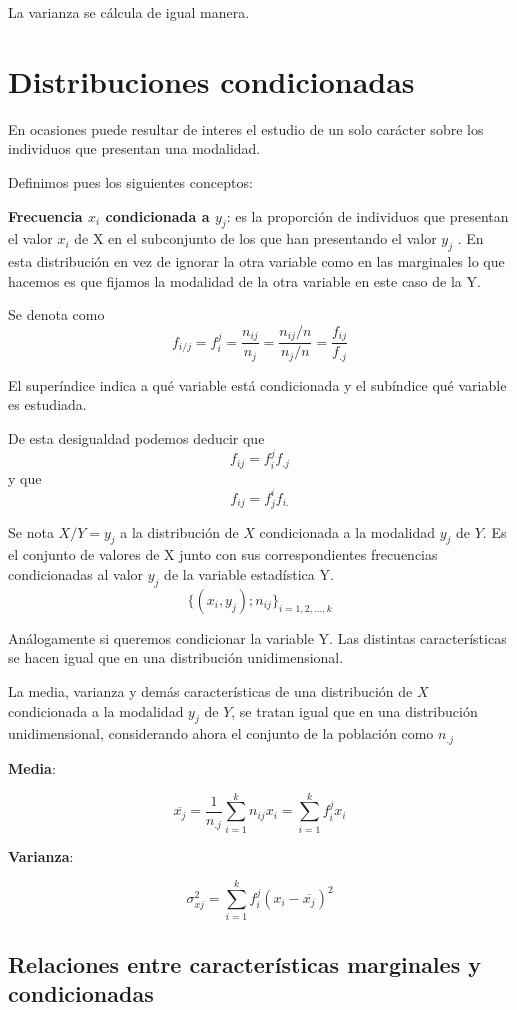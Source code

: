 \documentclass{article}
\begin{document}
	La varianza se cálcula de igual manera.

\section{Distribuciones condicionadas}

	En ocasiones puede resultar de interes el estudio de un solo carácter sobre los individuos que presentan una modalidad.
	
	Definimos pues los siguientes conceptos:
	
	\textbf{Frecuencia $x_i$ condicionada a $y_j$}: es la proporción de individuos que presentan el valor $x_i$ de X en el subconjunto de los que han presentando el valor $y_j$ . En esta distribución en vez de ignorar la otra variable como en las marginales lo que hacemos es que fijamos la modalidad de la otra variable en este caso de la Y.
	
	Se denota como $$ f_{i/j} = f_i^j = \frac{n_{ij} } {n_j} = \frac{n_{ij}/n}{n_j/n} = \frac{f_{ij}}{f_{.j}} $$
	
	El superíndice indica a qué variable está condicionada y el subíndice qué variable es estudiada.
	
	De esta desigualdad podemos deducir que $$ f_{ij} = f_i^j f_{.j} $$
	y que  $$ f_{ij} = f_j^i f_{i.} $$
	
	Se nota $X/Y=y_j$ a la distribución de $X$ condicionada a la modalidad $y_j$ de $Y$. Es el conjunto de valores de X junto con sus correspondientes frecuencias condicionadas al valor $y_j$ de la variable estadística Y.
	$$\{(x_i,y_j); n_{ij}\}_{i=1,2,\dots,k}$$
	
	Análogamente si queremos condicionar la variable Y.
	Las distintas características se hacen igual que en una distribución unidimensional.
	
	La media, varianza y demás características de una distribución de $X$ condicionada a la 		modalidad $y_j$ de $Y$, se tratan igual que en una distribución unidimensional, considerando ahora el conjunto de la población como $n_{.j}$
	
	\textbf{Media}:

	$$ \overline{x_j} = \frac{1}{n_{.j}} \sum_{i=1}^k n_{ij} x_i = \sum_{i=1}^k f_i^j x_i $$
	
	\textbf{Varianza}:

	$$ \sigma_{xj}^2 = \sum_{i=1}^k f_i^j(x_i - \overline{x_j})^2 $$
	
	
\subsection{Relaciones entre características marginales y condicionadas}
\end{document}
